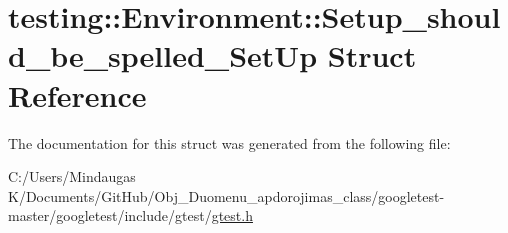 \hypertarget{structtesting_1_1_environment_1_1_setup__should__be__spelled___set_up}{}\section{testing\+::Environment\+::Setup\+\_\+should\+\_\+be\+\_\+spelled\+\_\+\+Set\+Up Struct Reference}
\label{structtesting_1_1_environment_1_1_setup__should__be__spelled___set_up}


The documentation for this struct was generated from the following file\+:\begin{DoxyCompactItemize}
\item 
C\+:/\+Users/\+Mindaugas K/\+Documents/\+Git\+Hub/\+Obj\+\_\+\+Duomenu\+\_\+apdorojimas\+\_\+class/googletest-\/master/googletest/include/gtest/\mbox{\hyperlink{googletest-master_2googletest_2include_2gtest_2gtest_8h}{gtest.\+h}}\end{DoxyCompactItemize}
